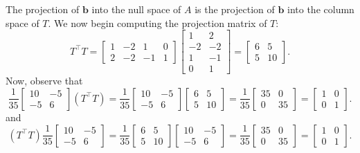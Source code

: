 \documentclass[11pt]{article}
\renewcommand{\vec}[1]{\mathbf{#1}}
\begin{document}
The projection of $\vec{b}$ into the null space of $A$ is the projection of $\vec{b}$ into the column space of $T$. We now begin computing the projection matrix of $T$:
\[
	T^{\top} T = \begin{bmatrix} 1 & -2 & 1 & 0 \\ 2 & -2 & -1 & 1 \end{bmatrix} \begin{bmatrix} 1 & 2 \\ -2 & -2 \\ 1 & -1 \\ 0 & 1 \end{bmatrix} = \begin{bmatrix} 6 & 5 \\ 5 & 10 \end{bmatrix}.
\]
Now, observe that
\[
	\frac{1}{35} \begin{bmatrix} 10 & -5 \\ -5 & 6 \end{bmatrix} (T^{\top}T) = \frac{1}{35} \begin{bmatrix} 10 & -5 \\ -5 & 6 \end{bmatrix} \begin{bmatrix} 6 & 5 \\ 5 & 10 \end{bmatrix} = \frac{1}{35} \begin{bmatrix} 35 & 0 \\ 0 & 35 \end{bmatrix} = \begin{bmatrix} 1 & 0 \\ 0 & 1 \end{bmatrix}.
\]
and
\[
	(T^{\top}T) \frac{1}{35} \begin{bmatrix} 10 & -5 \\ -5 & 6 \end{bmatrix} = \frac{1}{35} \begin{bmatrix} 6 & 5 \\ 5 & 10 \end{bmatrix} \begin{bmatrix} 10 & -5 \\ -5 & 6 \end{bmatrix} = \frac{1}{35} \begin{bmatrix} 35 & 0 \\ 0 & 35 \end{bmatrix} = \begin{bmatrix} 1 & 0 \\ 0 & 1 \end{bmatrix}.
\]
\end{document}
